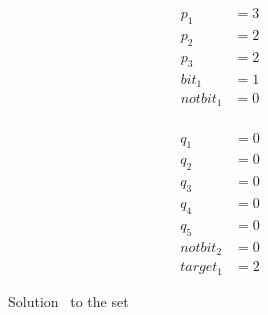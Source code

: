 \begin{figure}[t]
  \begin{minipage}[t]{.49\columnwidth}
    \begin{align*}
      p_1      & = 3 \\
      p_2      & = 2 \\
      p_3      & = 2 \\
      bit_1    & = 1 \\
      notbit_1    & = 0 \\
    \end{align*}
  \end{minipage}
  \begin{minipage}[t]{.49\columnwidth}
    \begin{align*}
      q_1      & = 0 \\
      q_2      & = 0 \\
      q_3      & = 0 \\
      q_4      & = 0 \\
      q_5      & = 0 \\
      notbit_2    & = 0 \\
      target_1 & = 2
    \end{align*}
  \end{minipage}
  \caption{Solution \solA\ to the set \setCp}
\end{figure}